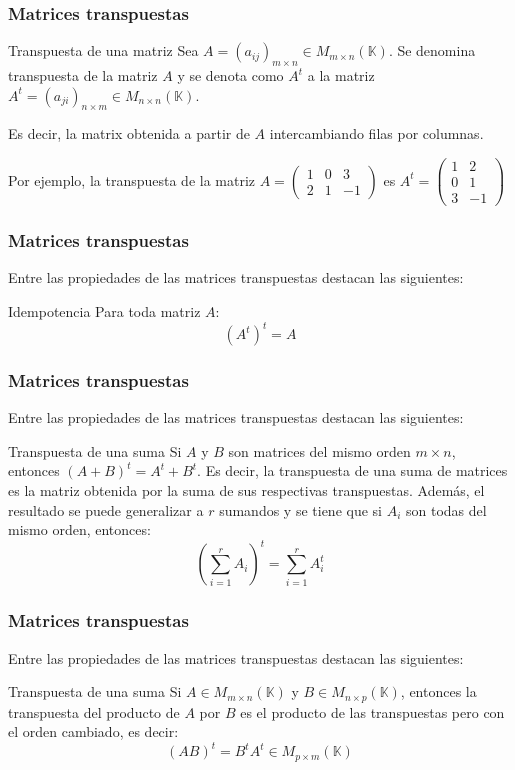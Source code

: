 \documentclass[12pt]{article}
\begin{document}
\begin{frame}
  \frametitle{Matrices transpuestas}
  
   \begin{block}{Transpuesta de una matriz}
Sea $A = (a_{ij})_{m\times n}\in M_{m\times n} (\mathbb{K})$. Se denomina transpuesta de la matriz $A$ y se denota como $A^t$ a la matriz $A^t = (a_{ji})_{n\times m}\in M_{n\times n}(\mathbb{K})$. 

Es decir, la matrix obtenida a partir de $A$ intercambiando filas por columnas. 
\end{block}

Por ejemplo, la transpuesta de la matriz $A =  \left(\begin{array}{ccc}1&0 & 3\\ 2&1 & -1\end{array}\right)$ es $A^t =  \left(\begin{array}{cc}1 & 2\\ 0 & 1\\3 &-1\end{array}\right)$
 \end{frame} 
 
 \begin{frame}
  \frametitle{Matrices transpuestas}
  Entre las propiedades de las matrices transpuestas destacan las siguientes:
   \begin{block}{Idempotencia}
Para toda matriz $A$:
\[(A^t)^t = A\]
\end{block}
 \end{frame} 


 \begin{frame}
  \frametitle{Matrices transpuestas}
   Entre las propiedades de las matrices transpuestas destacan las siguientes:
   \begin{block}{Transpuesta de una suma}
Si $A$ y $B$ son matrices del mismo orden $m\times n$, entonces $(A+B)^t = A^t+B^t$. 
Es decir, la transpuesta de una suma de matrices es la matriz obtenida por la suma de sus respectivas transpuestas. Adem\'as, el resultado se puede generalizar a $r$ sumandos y se tiene que si $A_i$ son todas del mismo orden, entonces:
\[\displaystyle(\sum_{i=1}^r A_i)^t = \sum_{i=1}^r A_i^t\]
\end{block}
 \end{frame} 



 \begin{frame}
  \frametitle{Matrices transpuestas}
  Entre las propiedades de las matrices transpuestas destacan las siguientes:
   \begin{block}{Transpuesta de una suma}
Si $A\in M_{m\times n}(\mathbb{K})$ y $B\in M_{n\times p}(\mathbb{K})$, entonces la transpuesta del producto de $A$ por $B$ es el producto de las transpuestas pero con el orden cambiado, es decir:
\[(AB)^t = B^tA^t\in M_{p\times m}(\mathbb{K})\]
\end{block}
 \end{frame} 
 
\end{document}
